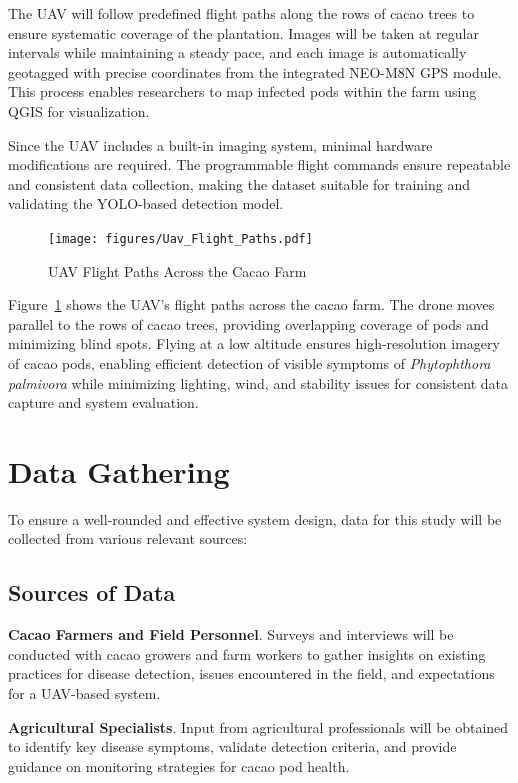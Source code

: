 The UAV will follow predefined flight paths along the rows of cacao trees to ensure systematic coverage of the plantation. Images will be taken at regular intervals while maintaining a steady pace, and each image is automatically geotagged with precise coordinates from the integrated NEO-M8N GPS module. This process enables researchers to map infected pods within the farm using QGIS for visualization.

Since the UAV includes a built-in imaging system, minimal hardware modifications are required. The programmable flight commands ensure repeatable and consistent data collection, making the dataset suitable for training and validating the YOLO-based detection model.

\begin{figure}[H]
	\centering
	\caption{UAV Flight Paths Across the Cacao Farm}
	\label{fig:uav_flight_paths}
	\texttt{[image: figures/Uav\_Flight\_Paths.pdf]}
\end{figure}

Figure~\ref{fig:uav_flight_paths} shows the UAV’s flight paths across the cacao farm. The drone moves parallel to the rows of cacao trees, providing overlapping coverage of pods and minimizing blind spots. Flying at a low altitude ensures high-resolution imagery of cacao pods, enabling efficient detection of visible symptoms of \textit{Phytophthora palmivora} while minimizing lighting, wind, and stability issues for consistent data capture and system evaluation.


\section{Data Gathering}
To ensure a well-rounded and effective system design, data for this study will be collected from various relevant sources:

\subsection*{Sources of Data}
\textbf{Cacao Farmers and Field Personnel}. Surveys and interviews will be conducted with cacao growers and farm workers to gather insights on existing practices for disease detection, issues encountered in the field, and expectations for a UAV-based system. 

\textbf{Agricultural Specialists}. Input from agricultural professionals will be obtained to identify key disease symptoms, validate detection criteria, and provide guidance on monitoring strategies for cacao pod health.

